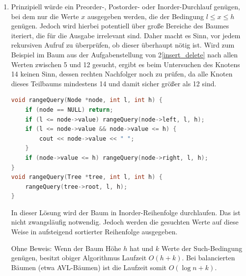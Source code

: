 \documentclass[11pt,a4paper]{article}
\begin{document}
\begin{loesung}
\begin{enumerate}
        \item 
        Prinzipiell würde ein Preorder-, Postorder- oder Inorder-Durchlauf genügen, bei dem nur die Werte $x$ ausgegeben werden, die der Bedingung $l \leq x \leq h$ genügen.
        Jedoch wird hierbei potentiell über große Bereiche des Baumes iteriert, die für die Ausgabe irrelevant sind.
        Daher macht es Sinn, vor jedem rekursiven Aufruf zu überprüfen, ob dieser überhaupt nötig ist.
        Wird zum Beispiel im Baum aus der Aufgabenstellung von 2\ref*{insert_delete} nach allen Werten zwischen 5 und 12 gesucht, ergibt es beim Untersuchen des Knotens 14 keinen Sinn, dessen rechten Nachfolger noch zu prüfen, da alle Knoten dieses Teilbaums mindestens 14 und damit sicher größer als 12 sind.
        \begin{lstlisting}[language=c++]
void rangeQuery(Node *node, int l, int h) {
    if (node == NULL) return;
    if (l <= node->value) rangeQuery(node->left, l, h);
    if (l <= node->value && node->value <= h) {
        cout << node->value << " ";
    }
    if (node->value <= h) rangeQuery(node->right, l, h);
}
void rangeQuery(Tree *tree, int l, int h) {
    rangeQuery(tree->root, l, h);
}
        \end{lstlisting}
        In dieser Lösung wird der Baum in Inorder-Reihenfolge durchlaufen.
        Das ist nicht zwangsläufig notwendig.
        Jedoch werden die gesuchten Werte auf diese Weise in aufsteigend sortierter Reihenfolge ausgegeben.

        Ohne Beweis: Wenn der Baum Höhe $h$ hat und $k$ Werte der Such-Bedingung genügen, besitzt obiger Algorithmus Laufzeit $O(h + k)$. Bei balancierten Bäumen (etwa AVL-Bäumen) ist die Laufzeit somit $O(\log n + k)$.
    \end{enumerate}
\end{loesung}
\end{document}
